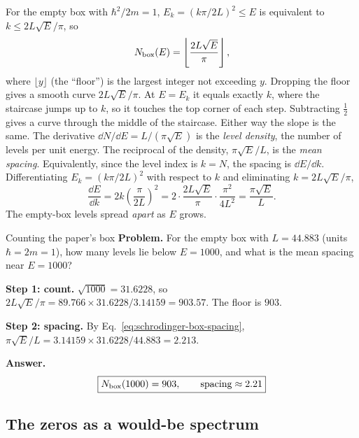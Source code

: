 For the empty box with $\hbar^2/2m=1$, $E_k=(k\pi/2L)^2\le E$ is equivalent to $k\le2L\sqrt E/\pi$, so
\begin{equation}
N_{\rm box}(E)=\left\lfloor\frac{2L\sqrt E}{\pi}\right\rfloor,
\label{eq:schrodinger-box-count}
\end{equation}
where $\lfloor y\rfloor$ (the ``floor'') is the largest integer not exceeding $y$. Dropping the floor gives a smooth curve $2L\sqrt E/\pi$. At $E=E_k$ it equals exactly $k$, where the staircase jumps up to $k$, so it touches the top corner of each step. Subtracting $\tfrac12$ gives a curve through the middle of the staircase. Either way the slope is the same. The derivative $\dd N/\dd E=L/(\pi\sqrt E)$ is the \emph{level density}, the number of levels per unit energy. The reciprocal of the density, $\pi\sqrt E/L$, is the \emph{mean spacing}. Equivalently, since the level index is $k=N$, the spacing is $\dd E/\dd k$. Differentiating $E_k=(k\pi/2L)^2$ with respect to $k$ and eliminating $k=2L\sqrt E/\pi$,
\begin{equation}
\frac{\dd E}{\dd k}=2k\left(\frac\pi{2L}\right)^2=2\cdot\frac{2L\sqrt E}{\pi}\cdot\frac{\pi^2}{4L^2}=\frac{\pi\sqrt E}{L}.
\label{eq:schrodinger-box-spacing}
\end{equation}
The empty-box levels spread \emph{apart} as $E$ grows.

\begin{sample}{Counting the paper's box}
\textbf{Problem.} For the empty box with $L=44.883$ (units $\hbar=2m=1$), how many levels lie below $E=1000$, and what is the mean spacing near $E=1000$?

\textbf{Step 1: count.} $\sqrt{1000}=31.6228$, so $2L\sqrt E/\pi=89.766\times31.6228/3.14159=903.57$. The floor is $903$.

\textbf{Step 2: spacing.} By Eq.~\eqref{eq:schrodinger-box-spacing}, $\pi\sqrt E/L=3.14159\times31.6228/44.883=2.213$.

\textbf{Answer.} \[\boxed{N_{\rm box}(1000)=903,\qquad \text{spacing}\approx2.21}\]
\end{sample}

\subsection{The zeros as a would-be spectrum}

